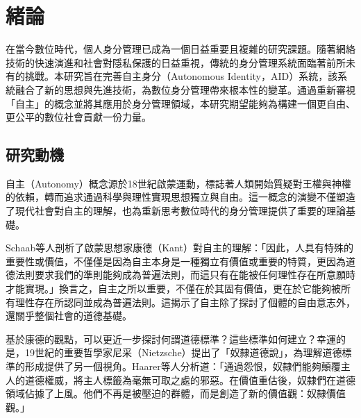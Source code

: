 
\chapter{緒論}
在當今數位時代，個人身分管理已成為一個日益重要且複雜的研究課題。隨著網絡技術的快速演進和社會對隱私保護的日益重視，傳統的身分管理系統面臨著前所未有的挑戰。本研究旨在完善自主身分（Autonomous Identity，AID）系統，該系統融合了新的思想與先進技術，為數位身分管理帶來根本性的變革。通過重新審視「自主」的概念並將其應用於身分管理領域，本研究期望能夠為構建一個更自由、更公平的數位社會貢獻一份力量。
\section{研究動機}
自主（Autonomy）概念源於18世紀啟蒙運動，標誌著人類開始質疑對王權與神權的依賴，轉而追求通過科學與理性實現思想獨立與自由。這一概念的演變不僅塑造了現代社會對自主的理解，也為重新思考數位時代的身分管理提供了重要的理論基礎。

Schaab等人\cite{Schaab2022}剖析了啟蒙思想家康德（Kant）對自主的理解：「因此，人具有特殊的重要性或價值，不僅僅是因為自主本身是一種獨立有價值或重要的特質，更因為道德法則要求我們的準則能夠成為普遍法則，而這只有在能被任何理性存在所意願時才能實現。」換言之，自主之所以重要，不僅在於其固有價值，更在於它能夠被所有理性存在所認同並成為普遍法則。這揭示了自主除了探討了個體的自由意志外，還關乎整個社會的道德基礎。

基於康德的觀點，可以更近一步探討何謂道德標準？這些標準如何建立？幸運的是，19世紀的重要哲學家尼采（Nietzsche）提出了「奴隸道德說」，為理解道德標準的形成提供了另一個視角。Haarer等人\cite{haarer2020nietzsche}分析道：「通過怨恨，奴隸們能夠顛覆主人的道德權威，將主人標籤為毫無可取之處的邪惡。在價值重估後，奴隸們在道德領域佔據了上風。他們不再是被壓迫的群體，而是創造了新的價值觀：奴隸價值觀。」

